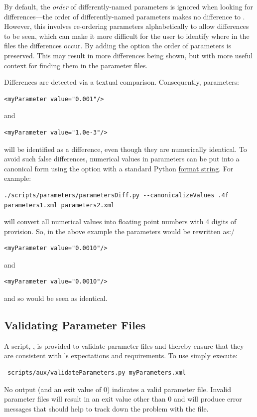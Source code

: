 By default, the \emph{order} of differently-named parameters is ignored when looking for differences---the order of differently-named parameters makes no difference to \glc. However, this involves re-ordering parameters alphabetically to allow differences to be seen, which can make it more difficult for the user to identify where in the files the differences occur. By adding the option  the order of parameters is preserved. This may result in more differences being shown, but with more useful context for finding them in the parameter files. 

Differences are detected via a textual comparison. Consequently, parameters:
\begin{verbatim}
<myParameter value="0.001"/>
\end{verbatim}
and
\begin{verbatim}
<myParameter value="1.0e-3"/>
\end{verbatim}
will be identified as a difference, even though they are numerically identical. To avoid such false differences, numerical values in parameters can be put into a canonical form using the  option with a standard Python \href{https://docs.python.org/3/library/string.html#formatstrings}{format string}. For example:
\begin{verbatim}
./scripts/parameters/parametersDiff.py --canonicalizeValues .4f parameters1.xml parameters2.xml
\end{verbatim}
will convert all numerical values into floating point numbers with 4 digits of provision. So, in the above example the parameters would be rewritten as:/
\begin{verbatim}
<myParameter value="0.0010"/>
\end{verbatim}
and
\begin{verbatim}
<myParameter value="0.0010"/>
\end{verbatim}
and so would be seen as identical.

\subsection{Validating Parameter Files}

A script, , is provided to validate parameter files and thereby ensure that they are consistent with \glc's expectations and requirements. To use simply execute:
\begin{verbatim}
 scripts/aux/validateParameters.py myParameters.xml
\end{verbatim}
No output (and an exit value of 0) indicates a valid parameter file. Invalid parameter files will result in an exit value other than 0 and will produce error messages that should help to track down the problem with the file.

